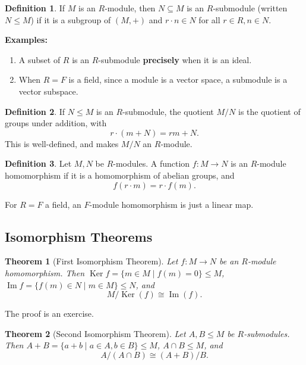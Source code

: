 \documentclass[12pt]{article}
\DeclareMathOperator{\Ker}{Ker}
\DeclareMathOperator{\Img}{Im}
\newtheorem{theorem}{Theorem}[section]
\theoremstyle{definition}
\newtheorem{definition}{Definition}[section]
\theoremstyle{remark}
\begin{document}
\begin{definition}
	If $M$ is an $R$-module, then $N \subseteq M$ is an $R$-submodule (written $N \leq M$) if it is a subgroup of $(M, +)$ and $r \cdot n \in N$ for all $r \in R, n \in N$.
\end{definition}

\textbf{Examples:} 

\begin{enumerate}[label = (\roman*)]
	\item A subset of $R$ is an $R$-submodule \textbf{precisely} when it is an ideal.
	\item When $R = F$ is a field, since a module is a vector space, a submodule is a vector subspace.
\end{enumerate}

\begin{definition}
	If $N \leq M$ is an $R$-submodule, the quotient $M/N$ is the quotient of groups under addition, with
	\[
		r \cdot (m + N) = rm + N
	.\]
	This is well-defined, and makes $M/N$ an $R$-module.
\end{definition}

\begin{definition}
	Let $M, N$ be $R$-modules. A function $f : M \to N$ is an $R$-module homomorphism if it is a homomorphism of abelian groups, and
	\[
		f(r \cdot m) = r \cdot f(m)
	.\]
\end{definition}

For $R = F$ a field, an $F$-module homomorphism is just a linear map.

\subsection{Isomorphism Theorems}%
\label{sub:isomorphism_theorems_modules}

\begin{theorem}[First Isomorphism Theorem]
	Let $f : M \to N$ be an $R$-module homomorphism. Then $\Ker f = \{m \in M \mid f(m) = 0\} \leq M$, $\Img f = \{f(m) \in N \mid m \in M\} \leq N$, and
	\[
		M / \Ker(f) \cong \Img(f)
	.\]
\end{theorem}

The proof is an exercise.

\begin{theorem}[Second Isomorphism Theorem]
	Let $A, B \leq M$ be $R$-submodules. Then $A + B = \{a + b \mid a \in A, b \in B\} \leq M$, $A \cap B \leq M$, and
	\[
		A / (A \cap B) \cong (A + B) / B
	.\]
\end{theorem}
\end{document}
